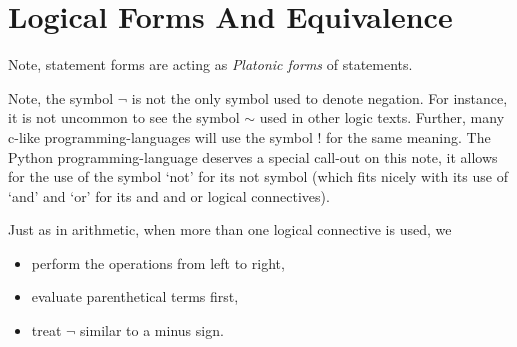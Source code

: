 \guard

\section{Logical Forms And Equivalence}
\label{sec:logicalFormsAndEquivalence}



Note, statement forms are acting as {\it Platonic forms} of statements.



Note, the symbol $\neg$ is not the only symbol used to denote negation.
For instance, it is not uncommon to see the symbol $\sim$ used in other logic texts.
Further, many c-like programming-languages will use the symbol $!$ for the same meaning.
The Python programming-language deserves a special call-out on this note, it allows for the use of the symbol `not' for its not symbol (which fits nicely with its use of `and' and `or' for its and and or logical connectives).




Just as in arithmetic, when more than one logical connective is used, we
\begin{itemize}
  \item perform the operations from left to right,
  \item evaluate parenthetical terms first,
  \item treat $\neg$ similar to a minus sign.
\end{itemize}





















